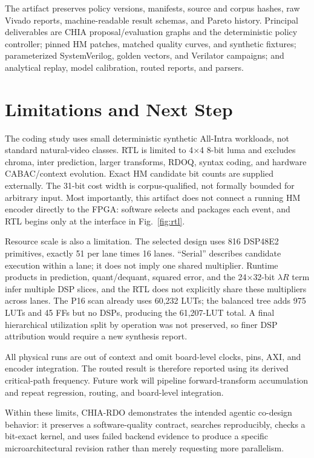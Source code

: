 \documentclass[journal]{IEEEtran}
\newcommand{\project}{\textsc{CHIA-RDO}\xspace}
\begin{document}
The artifact preserves policy versions, manifests, source and corpus hashes,
raw Vivado reports, machine-readable result schemas, and Pareto history.
Principal deliverables are CHIA proposal/evaluation graphs and the deterministic
policy controller; pinned HM patches, matched quality curves, and synthetic
fixtures; parameterized SystemVerilog, golden vectors, and Verilator campaigns;
and analytical replay, model calibration, routed reports, and parsers.

\balance
\section{Limitations and Next Step}
The coding study uses small deterministic synthetic All-Intra workloads, not
standard natural-video classes. RTL is limited to 4$\times$4 8-bit luma and
excludes chroma, inter prediction, larger transforms, RDOQ, syntax coding, and
hardware CABAC/context evolution. Exact HM candidate bit counts are supplied
externally. The 31-bit cost width is corpus-qualified, not formally bounded for
arbitrary input. Most importantly, this artifact does not connect a running HM
encoder directly to the FPGA: software selects and packages each event, and
RTL begins only at the interface in Fig.~\ref{fig:rtl}.

Resource scale is also a limitation. The selected design uses 816 DSP48E2
primitives, exactly 51 per lane times 16 lanes. ``Serial'' describes candidate
execution within a lane; it does not imply one shared multiplier. Runtime
products in prediction, quant/dequant, squared error, and the 24$\times$32-bit
$\lambda R$ term infer multiple DSP slices, and the RTL does not explicitly
share these multipliers across lanes. The P16 scan already uses 60,232 LUTs;
the balanced tree adds 975 LUTs and 45 FFs but no DSPs, producing the
61,207-LUT total. A final hierarchical utilization split by operation was not
preserved, so finer DSP attribution would require a new synthesis report.

All physical runs are out of context and omit board-level clocks, pins, AXI,
and encoder integration. The routed result is therefore reported using its
derived critical-path frequency. Future work will pipeline forward-transform
accumulation and repeat regression, routing, and board-level integration.

Within these limits, \project demonstrates the intended agentic co-design
behavior: it preserves a software-quality contract, searches reproducibly,
checks a bit-exact kernel, and uses failed backend evidence to produce a
specific microarchitectural revision rather than merely requesting more
parallelism.
\end{document}

